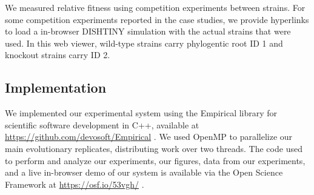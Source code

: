 We measured relative fitness using competition experiments between strains.
For some competition experiments reported in the case studies, we provide hyperlinks to load a in-browser DISHTINY simulation with the actual strains that were used.
In this web viewer, wild-type strains carry phylogentic root ID 1 and knockout strains carry ID 2.

\subsection{Implementation}

We implemented our experimental system using the Empirical library for scientific software development in C++, available at \url{https://github.com/devosoft/Empirical} \citep{charles_ofria_2019_2575607}.
We used OpenMP to parallelize our main evolutionary replicates, distributing work over two threads.
The code used to perform and analyze our experiments, our figures, data from our experiments, and a live in-browser demo of our system is available via the Open Science Framework at \url{https://osf.io/53vgh/} \citep{foster2017open}.
